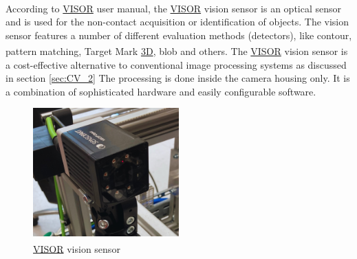 According to \hyperref[acro:VISOR]{VISOR}\textsuperscript{\textregistered} \cite[page 22]{visor_user_manual} user manual, the \hyperref[acro:VISOR]{VISOR}\textsuperscript{\textregistered} vision sensor is an optical sensor and is used for the non-contact acquisition or identification of objects.
The vision sensor features a number of different evaluation methods (detectors), like contour, pattern matching, Target Mark \hyperref[acro:3D]{3D}, blob and others.
The \hyperref[acro:VISOR]{VISOR}\textsuperscript{\textregistered} vision sensor is a cost-effective alternative to conventional image processing systems as discussed in
section \ref{sec:CV_2} The processing is done inside the camera housing only. It is a combination of sophisticated hardware and easily configurable software. \cite{sensopart-visor}
\begin{figure}[h]
    \centering
    \includegraphics[width=0.5\textwidth]{figures/vision-sensor.png}
    \caption{\hyperref[acro:VISOR]{VISOR}\textsuperscript{\textregistered} vision sensor}
    \label{fig:vision-sensor}
\end{figure}

